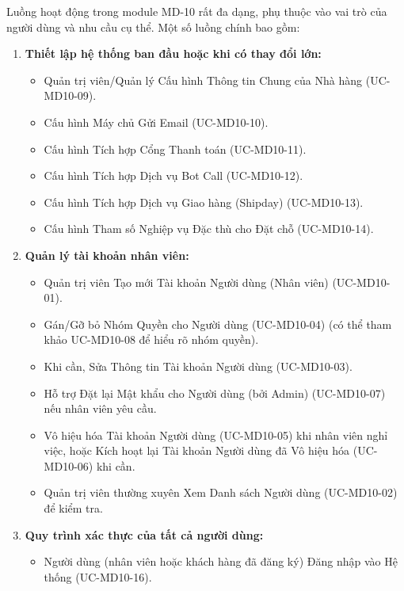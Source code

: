 \label{sssec:md10_overall_workflow_full}
Luồng hoạt động trong module MD-10 rất đa dạng, phụ thuộc vào vai trò của người dùng và nhu cầu cụ thể. Một số luồng chính bao gồm:
\begin{enumerate}
    \item \textbf{Thiết lập hệ thống ban đầu hoặc khi có thay đổi lớn:}
        \begin{itemize}
            \item Quản trị viên/Quản lý Cấu hình Thông tin Chung của Nhà hàng (UC-MD10-09).
            \item Cấu hình Máy chủ Gửi Email (UC-MD10-10).
            \item Cấu hình Tích hợp Cổng Thanh toán (UC-MD10-11).
            \item Cấu hình Tích hợp Dịch vụ Bot Call (UC-MD10-12).
            \item Cấu hình Tích hợp Dịch vụ Giao hàng (Shipday) (UC-MD10-13).
            \item Cấu hình Tham số Nghiệp vụ Đặc thù cho Đặt chỗ (UC-MD10-14).
        \end{itemize}
    \item \textbf{Quản lý tài khoản nhân viên:}
        \begin{itemize}
            \item Quản trị viên Tạo mới Tài khoản Người dùng (Nhân viên) (UC-MD10-01).
            \item Gán/Gỡ bỏ Nhóm Quyền cho Người dùng (UC-MD10-04) (có thể tham khảo UC-MD10-08 để hiểu rõ nhóm quyền).
            \item Khi cần, Sửa Thông tin Tài khoản Người dùng (UC-MD10-03).
            \item Hỗ trợ Đặt lại Mật khẩu cho Người dùng (bởi Admin) (UC-MD10-07) nếu nhân viên yêu cầu.
            \item Vô hiệu hóa Tài khoản Người dùng (UC-MD10-05) khi nhân viên nghỉ việc, hoặc Kích hoạt lại Tài khoản Người dùng đã Vô hiệu hóa (UC-MD10-06) khi cần.
            \item Quản trị viên thường xuyên Xem Danh sách Người dùng (UC-MD10-02) để kiểm tra.
        \end{itemize}
    \item \textbf{Quy trình xác thực của tất cả người dùng:}
        \begin{itemize}
            \item Người dùng (nhân viên hoặc khách hàng đã đăng ký) Đăng nhập vào Hệ thống (UC-MD10-16).

\end{itemize}
\end{enumerate}
